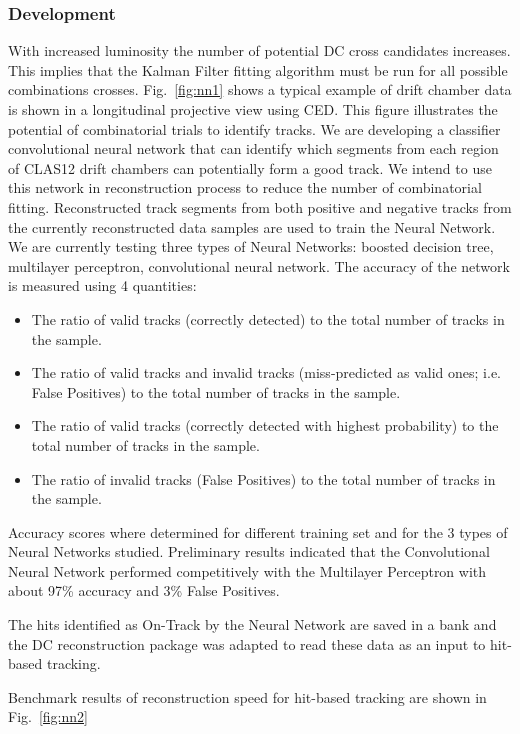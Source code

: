 \subsubsection{Development}
With increased luminosity the number of potential DC cross candidates
increases.  This implies that the  Kalman Filter fitting algorithm must be run for all possible
combinations crosses.  Fig.~\ref{fig:nn1} shows a typical example of drift
chamber data is shown in a longitudinal projective view using CED. 
This figure illustrates the potential of combinatorial trials to identify tracks. 
We are developing a classifier convolutional neural network that can
identify which segments from each region of CLAS12 drift chambers can potentially form a
good track. We intend to use this network in reconstruction process to reduce the number of
combinatorial fitting.
Reconstructed track segments from both positive and negative tracks from the currently reconstructed data samples are used to train the Neural Network. 
We are currently testing three types of Neural Networks: boosted decision tree, multilayer perceptron, convolutional neural network.  
The accuracy of the network is measured using 4 quantities:
\begin{itemize}
\item{The ratio of valid tracks (correctly detected) to the total number of tracks in the sample. }
\item{The ratio of valid tracks and  invalid tracks (miss-predicted as valid ones; i.e. False Positives) to the total number of tracks in the sample. }
\item{The ratio of valid tracks (correctly detected with highest probability) to the total number of tracks in the sample. }
\item{The ratio of invalid tracks (False Positives) to the total number of tracks in the sample. }
\end{itemize}
Accuracy scores where determined for different training set and for the 3 types of Neural Networks studied.  Preliminary results indicated that the Convolutional Neural Network performed competitively with the Multilayer Perceptron with about 97\% accuracy and 3\% False Positives. 

The hits identified as On-Track by the Neural Network are saved in a bank and the DC reconstruction package was adapted to read these data as an input to hit-based tracking.

Benchmark results of reconstruction speed for hit-based tracking are shown in Fig.~\ref{fig:nn2}

